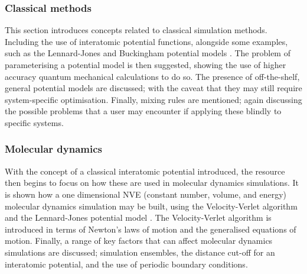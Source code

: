 \subsubsection{Classical methods}

This section introduces concepts related to classical simulation methods.
Including the use of interatomic potential functions, alongside some examples, such as the Lennard-Jones and Buckingham potential models \cite{lennard-jones_determination_1924,buckingham_classical_1938}.
The problem of parameterising a potential model is then suggested, showing the use of higher accuracy quantum mechanical calculations to do so.
The presence of off-the-shelf, general potential models are discussed; with the caveat that they may still require system-specific optimisation.
Finally, mixing rules are mentioned; again discussing the possible problems that a user may encounter if applying these blindly to specific systems.

\subsubsection{Molecular dynamics}
With the concept of a classical interatomic potential introduced, the resource then begins to focus on how these are used in molecular dynamics simulations.
It is shown how a one dimensional NVE (constant number, volume, and energy) molecular dynamics simulation may be built, using the Velocity-Verlet algorithm and the Lennard-Jones potential model \cite{swope_computer_1982,lennard-jones_determination_1924}.
The Velocity-Verlet algorithm is introduced in terms of Newton's laws of motion and the generalised equations of motion.
Finally, a range of key factors that can affect molecular dynamics simulations are discussed; simulation ensembles, the distance cut-off for an interatomic potential, and the use of periodic boundary conditions.

